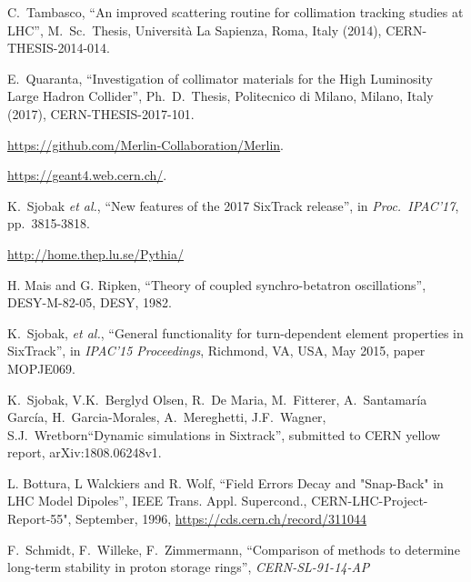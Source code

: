 \documentclass[a4paper,
              ]{jacow}
\begin{document}
\begin{thebibliography}{99}
C.~Tambasco, ``An improved scattering routine for collimation tracking studies
at LHC'', M.~Sc.~Thesis, Universit\`a La Sapienza, Roma, Italy (2014), CERN-THESIS-2014-014.

E.~Quaranta, ``Investigation of collimator materials for the High Luminosity
Large Hadron Collider'', Ph.~D.~Thesis, Politecnico di Milano, Milano, Italy (2017), CERN-THESIS-2017-101.

 \url{https://github.com/Merlin-Collaboration/Merlin}.

\url{https://geant4.web.cern.ch/}.

K.~Sjobak \emph{et al.}, ``New features of the 2017 SixTrack release'',
in \emph{Proc.~IPAC'17}, pp.~3815-3818.


 \url{http://home.thep.lu.se/Pythia/}


H. Mais and G. Ripken, ``Theory of coupled synchro-betatron oscillations'', 
DESY-M-82-05, DESY, 1982.


K.\ Sjobak, {\it et al.},
``General functionality for turn-dependent element properties in SixTrack'',
in \textit{IPAC'15 Proceedings}, Richmond, VA, USA, May 2015, paper MOPJE069.

K.\ Sjobak, V.K.\ Berglyd Olsen, R.\ De Maria, M.\ Fitterer, A.\ Santamaría García, H.\ Garcia-Morales, A.\ Mereghetti, J.F.\ Wagner, S.J.\ Wretborn``Dynamic simulations in Sixtrack'', submitted to CERN yellow report, arXiv:1808.06248v1.

 L. Bottura, L Walckiers and R. Wolf, ``Field Errors Decay and "Snap-Back" in LHC Model Dipoles'', IEEE Trans. Appl. Supercond.,  CERN-LHC-Project-Report-55", September, 1996, \url{https://cds.cern.ch/record/311044}




F.~Schmidt, F.~Willeke, F.~Zimmermann, ``Comparison of methods to determine long-term stability in proton storage rings'', \emph{CERN-SL-91-14-AP}


\end{thebibliography}
\end{document}
